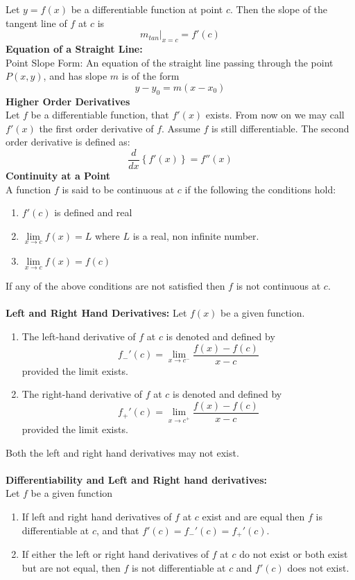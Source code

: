 \documentclass[14pt]{article}
\begin{document}
    Let $y=f(x)$ be a differentiable function at point $c$. Then the
    slope of the tangent line of $f$ at $c$ is $$\left.
    m_{tan}\right|_{x=c}=f'(c)$$ \textbf{Equation of a Straight Line:}\\
    Point Slope Form: An equation of the straight line passing through
    the point $P(x,y)$, and has slope $m$ is of the form
    $$y-y_0=m(x-x_0)$$ \textbf{Higher Order Derivatives}\\
    Let $f$ be a differentiable function, that $f'(x)$ exists. From now
    on we may call $f'(x)$ the first order derivative of $f$. Assume $f$
    is still differentiable. The second order derivative is defined as:
    $$\frac{d}{dx}\left\{f'(x)\right\}=f''(x)$$ \textbf{Continuity at a
    Point}\\
    A function $f$ is said to be continuous at $c$ if the following the
    conditions hold: 
    \begin{enumerate}
        \item $f'(c)$ is defined and real
        \item $\lim \limits_{x\rightarrow c} f(x)=L$ where $L$ is a
        real, non infinite number.
        \item $\lim \limits_{x\rightarrow c} f(x)=f(c)$
    \end{enumerate}
    If any of the above conditions are not satisfied then $f$ is not
    continuous at $c$.\\\\
    \textbf{Left and Right Hand Derivatives:}
    Let $f(x)$ be a given function.
    \begin{enumerate}
        \item The left-hand derivative of $f$ at $c$ is denoted and
        defined by $$f_-'(c)=\lim \limits_{x\rightarrow c^-}
        \frac{f(x)-f(c)}{x-c}$$ provided the limit exists.
        \item The right-hand derivative of $f$ at $c$ is denoted and
    defined by $$f_+'(c)=\lim \limits_{x\rightarrow c^+}
    \frac{f(x)-f(c)}{x-c}$$ provided the limit exists.
    \end{enumerate}Both the left and right hand derivatives may not
    exist.\\\\
    \textbf{Differentiability and Left and Right hand derivatives:}\\
    Let $f$ be a given function
    \begin{enumerate}
        \item If left and right hand derivatives of $f$ at $c$ exist and
        are equal then $f$ is differentiable at $c$, and that
        $f'(c)=f_-'(c)=f_+'(c)$.
        \item If either the left or right hand derivatives of $f$ at $c$
        do not exist or both exist but are not equal, then $f$ is not
        differentiable at $c$ and $f'(c)$ does not exist.
    \end{enumerate}
\end{document}
